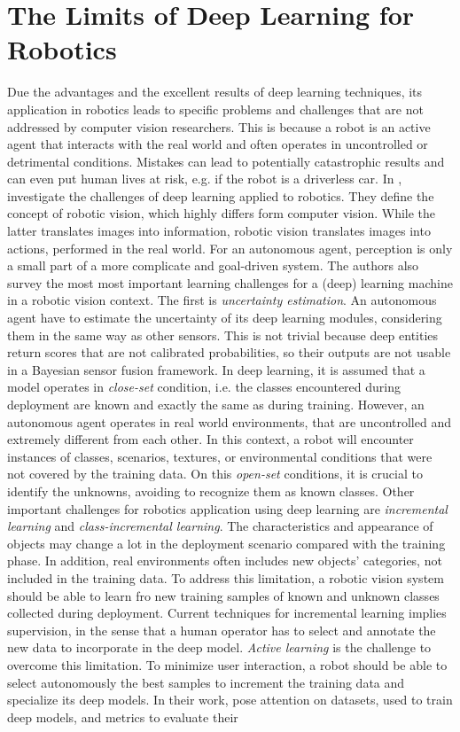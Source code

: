  \section{The Limits of Deep Learning for Robotics}
 
 Due the advantages and the excellent results of deep learning techniques, its application in robotics leads to specific problems and challenges that are not addressed by computer vision researchers. This is because a robot is an active agent that interacts with the real world and often operates in uncontrolled or detrimental conditions. Mistakes can lead to potentially catastrophic results and can even put human lives at risk, e.g. if the robot is a driverless car. In \cite{surveydeeplimits}, \citeauthor{surveydeeplimits} investigate the challenges of deep learning applied to robotics. They define the concept of robotic vision, which highly differs form computer vision. While the latter translates images into information, robotic vision translates images into actions, performed in the real world. For an autonomous agent, perception is only a small part of a more complicate and goal-driven system. The authors also survey the most most important learning challenges for a (deep) learning machine in a robotic vision context. The first is \textit{uncertainty estimation}. An autonomous agent have to estimate the uncertainty of its deep learning modules, considering them in the same way as other sensors. This is not trivial because deep entities return scores that are not calibrated probabilities, so their outputs are not usable in a Bayesian sensor fusion framework. In deep learning, it is assumed that a model operates in \textit{close-set} condition,  i.e. the classes encountered during deployment are known and exactly the same as during training. However, an autonomous agent operates in real world environments, that are uncontrolled and extremely different from each other. In this context, a robot will encounter instances of classes, scenarios, textures, or environmental conditions that were not covered by the training data. On this \textit{open-set} conditions, it is crucial to identify the unknowns, avoiding to recognize them as known classes. Other important challenges for robotics application using deep learning are \textit{incremental learning} and \textit{class-incremental learning}. The characteristics and appearance of objects may change a lot in the deployment scenario compared with the training phase. In addition, real environments often includes new objects' categories, not included in the training data. To address this limitation, a robotic vision system should be able to learn fro new training samples of known and unknown classes collected during deployment. Current techniques for incremental learning implies supervision, in the sense that a human operator has to select and annotate the new data to incorporate in the deep model. \textit{Active learning} is the challenge to overcome this limitation. To minimize user interaction, a robot should be able to select autonomously the best samples to increment the training data and specialize its deep models. In their work, \citeauthor{surveydeeplimits} pose attention on datasets, used to train deep models, and metrics to evaluate their 